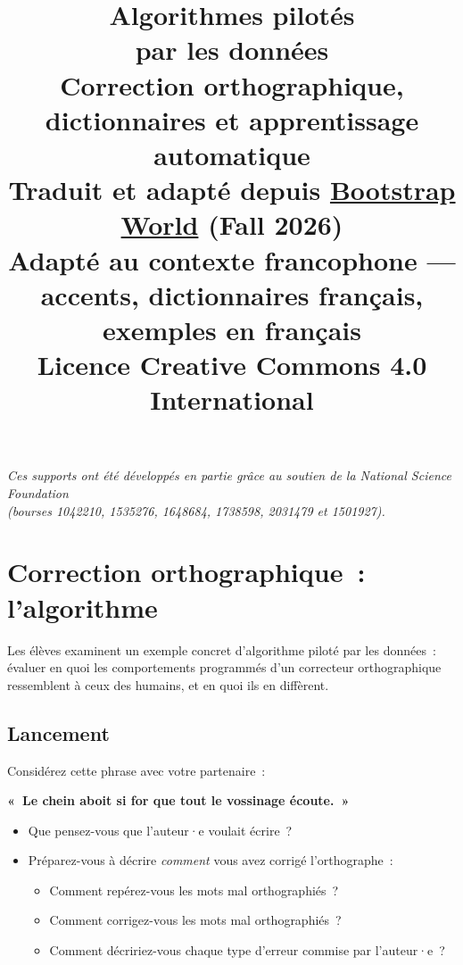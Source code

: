 \documentclass[12pt,a4paper]{article}
\title{%
  \vspace{-2cm}
  {\Huge\bfseries Algorithmes pilotés}\\[0.3em]
  {\Huge\bfseries par les données}\\[0.5em]
  {\large Correction orthographique, dictionnaires et apprentissage automatique}\\[1em]
  {\normalsize Traduit et adapté depuis \href{https://www.bootstrapworld.org/materials/fall2026/en-us/lessons/data-driven-algorithms/}{Bootstrap World} (Fall 2026)}\\
  {\normalsize Adapté au contexte francophone — accents, dictionnaires français, exemples en français}\\[0.5em]
  {\normalsize Licence Creative Commons 4.0 International}
}
\date{}
\author{}
\begin{document}
\maketitle
\thispagestyle{empty}

\vspace{2cm}
\begin{center}
  \textit{Ces supports ont été développés en partie grâce au soutien de la National Science Foundation\\
  (bourses 1042210, 1535276, 1648684, 1738598, 2031479 et 1501927).}
\end{center}

\newpage
\tableofcontents
\newpage

\section{Correction orthographique~: l'algorithme}

\begin{overviewbox}
  Les élèves examinent un exemple concret d'algorithme piloté par les données~: évaluer en quoi les comportements programmés d'un correcteur orthographique ressemblent à ceux des humains, et en quoi ils en diffèrent.
\end{overviewbox}

\subsection{Lancement}

\begin{activitybox}
  Considérez cette phrase avec votre partenaire~:

  \begin{center}
    \textbf{\large «~Le chein aboit si for que tout le vossinage écoute.~»}
  \end{center}

  \begin{itemize}
    \item Que pensez-vous que l'auteur·e voulait écrire~?
    \item Préparez-vous à décrire \emph{comment} vous avez corrigé l'orthographe~:
    \begin{itemize}
      \item Comment repérez-vous les mots mal orthographiés~?
      \item Comment corrigez-vous les mots mal orthographiés~?
      \item Comment décririez-vous chaque type d'erreur commise par l'auteur·e~?
    \end{itemize}
  \end{itemize}
\end{activitybox}
\end{document}
